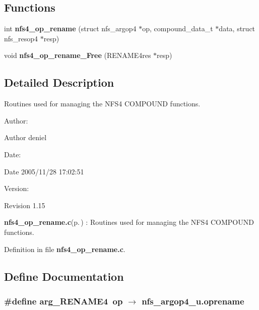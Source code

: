 \subsection*{Functions}
\begin{CompactItemize}
\item 
int {\bf nfs4\_\-op\_\-rename} (struct nfs\_\-argop4 $\ast$op, compound\_\-data\_\-t $\ast$data, struct nfs\_\-resop4 $\ast$resp)
\item 
void {\bf nfs4\_\-op\_\-rename\_\-Free} (RENAME4res $\ast$resp)
\end{CompactItemize}


\subsection{Detailed Description}
Routines used for managing the NFS4 COMPOUND functions. 

\begin{Desc}
\item[Author:]\begin{Desc}
\item[Author]deniel \end{Desc}
\end{Desc}
\begin{Desc}
\item[Date:]\begin{Desc}
\item[Date]2005/11/28 17:02:51 \end{Desc}
\end{Desc}
\begin{Desc}
\item[Version:]\begin{Desc}
\item[Revision]1.15 \end{Desc}
\end{Desc}
{\bf nfs4\_\-op\_\-rename.c}{\rm (p.\,\pageref{nfs4__op__rename_8c})} : Routines used for managing the NFS4 COMPOUND functions.

Definition in file {\bf nfs4\_\-op\_\-rename.c}.

\subsection{Define Documentation}
\subsubsection{\setlength{\rightskip}{0pt plus 5cm}\#define arg\_\-RENAME4\ op $\rightarrow$ nfs\_\-argop4\_\-u.oprename}\label{nfs4__op__rename_8c_a0}


